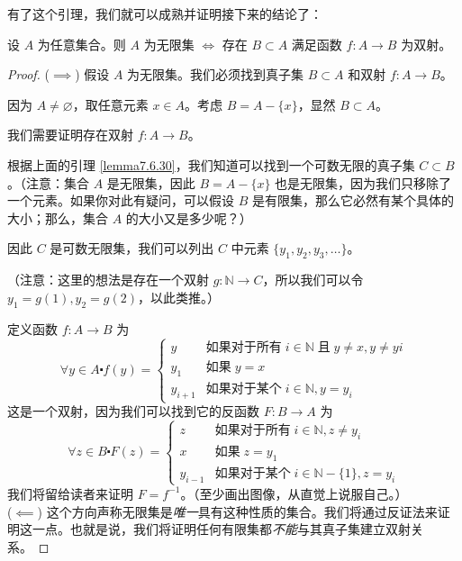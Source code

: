 有了这个引理，我们就可以成熟并证明接下来的结论了：

\begin{theorem}
    设 $A$ 为任意集合。则 $A$ 为无限集 $\iff$ 存在 $B \subset A$ 满足函数 $f : A \to B$ 为双射。
\end{theorem}

\begin{proof}
    ($\implies$) 假设 $A$ 为无限集。我们必须找到真子集 $B \subset A$ 和双射 $f : A \to B$。

    因为 $A \ne \varnothing$，取任意元素 $x \in A$。考虑 $B = A-\{x\}$，显然 $B \subset A$。

    我们需要证明存在双射 $f : A \to B$。

    根据上面的引理 \ref{lemma7.6.30}，我们知道可以找到一个可数无限的真子集 $C \subset B$。（注意：集合 $A$ 是无限集，因此 $B = A - \{x\}$ 也是无限集，因为我们只移除了一个元素。如果你对此有疑问，可以假设 $B$ 是有限集，那么它必然有某个具体的大小；那么，集合 $A$ 的大小又是多少呢？）

    因此 $C$ 是可数无限集，我们可以列出 $C$ 中元素 $\{y_1, y_2, y_3, \dots\}$。

    （注意：这里的想法是存在一个双射 $g : \mathbb{N} \to C$，所以我们可以令 $y_1 = g(1), y_2 = g(2)$，以此类推。）

    定义函数 $f : A \to B$ 为
    \[\forall y \in A \centerdot f(y) = \begin{cases}
            y       & \text{如果对于所有}\; i \in \mathbb{N} \;\text{且}\; y \ne x, y \ne yi \\
            y_1     & \text{如果}\; y = x                                               \\
            y_{i+1} & \text{如果对于某个}\; i \in \mathbb{N}, y = y_i
        \end{cases}\]
    这是一个双射，因为我们可以找到它的反函数 $F : B \to A$ 为
    \[\forall z \in B \centerdot F(z) = \begin{cases}
            z & \text{如果对于所有}\; i \in \mathbb{N}, z \ne y_i \\
            x & \text{如果}\; z = y_1                \\
            y_{i-1} &\text{如果对于某个}\; i \in \mathbb{N}-\{1\}, z = y_i
        \end{cases}\]
    我们将留给读者来证明 $F = f^{-1}$。（至少画出图像，从直觉上说服自己。）\\

    ($\impliedby$) 这个方向声称无限集是\emph{唯一}具有这种性质的集合。我们将通过反证法来证明这一点。也就是说，我们将证明任何有限集都\emph{不能}与其真子集建立双射关系。


\end{proof}
